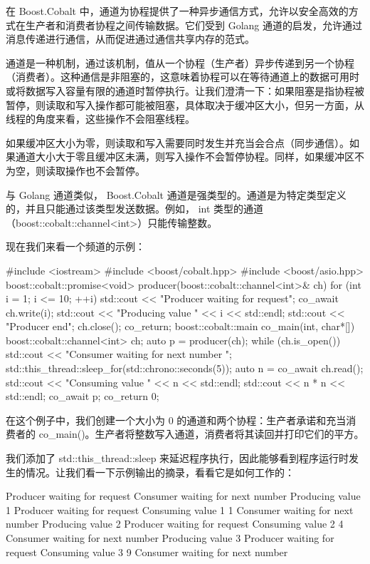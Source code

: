 在 Boost.Cobalt 中，通道为协程提供了一种异步通信方式，允许以安全高效的方式在生产者和消费者协程之间传输数据。它们受到 Golang 通道的启发，允许通过消息传递进行通信，从而促进通过通信共享内存的范式。

通道是一种机制，通过该机制，值从一个协程（生产者）异步传递到另一个协程（消费者）。这种通信是非阻塞的，这意味着协程可以在等待通道上的数据可用时或将数据写入容量有限的通道时暂停执行。让我们澄清一下：如果阻塞是指协程被暂停，则读取和写入操作都可能被阻塞，具体取决于缓冲区大小，但另一方面，从线程的角度来看，这些操作不会阻塞线程。

如果缓冲区大小为零，则读取和写入需要同时发生并充当会合点（同步通信）。如果通道大小大于零且缓冲区未满，则写入操作不会暂停协程。同样，如果缓冲区不为空，则读取操作也不会暂停。

与 Golang 通道类似， Boost.Cobalt 通道是强类型的。通道是为特定类型定义的，并且只能通过该类型发送数据。例如， int 类型的通道（boost::cobalt::channel<int>）只能传输整数。

现在我们来看一个频道的示例：

\begin{cpp}
#include <iostream>
#include <boost/cobalt.hpp>
#include <boost/asio.hpp>
boost::cobalt::promise<void> producer(boost::cobalt::channel<int>& ch)
{
    for (int i = 1; i <= 10; ++i) {
        std::cout << "Producer waiting for request\n";
        co_await ch.write(i);
        std::cout << "Producing value " << i << std::endl;
    }
    std::cout << "Producer end\n";
    ch.close();
    co_return;
}
boost::cobalt::main co_main(int, char*[]) {
    boost::cobalt::channel<int> ch;
    auto p = producer(ch);
    while (ch.is_open()) {
        std::cout << "Consumer waiting for next number \n";
        std::this_thread::sleep_for(std::chrono::seconds(5));
        auto n = co_await ch.read();
        std::cout << "Consuming value " << n << std::endl;
        std::cout << n * n << std::endl;
    }
    co_await p;
    co_return 0;
}
\end{cpp}

在这个例子中，我们创建一个大小为 0 的通道和两个协程：生产者承诺和充当消费者的 co\_main()。生产者将整数写入通道，消费者将其读回并打印它们的平方。

我们添加了 std::this\_thread::sleep 来延迟程序执行，因此能够看到程序运行时发生的情况。让我们看一下示例输出的摘录，看看它是如何工作的：

\begin{shell}
Producer waiting for request
Consumer waiting for next number
Producing value 1
Producer waiting for request
Consuming value 1
1
Consumer waiting for next number
Producing value 2
Producer waiting for request
Consuming value 2
4
Consumer waiting for next number
Producing value 3
Producer waiting for request
Consuming value 3
9
Consumer waiting for next number
\end{shell}

